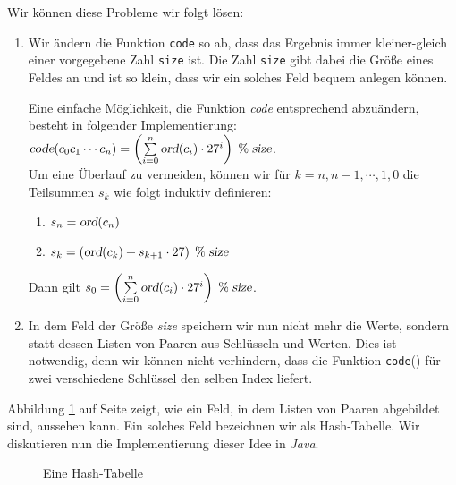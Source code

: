 Wir k\"onnen diese Probleme wir folgt l\"osen:
\begin{enumerate}
\item Wir \"andern die Funktion \texttt{code} so ab, dass das Ergebnis
      immer kleiner-gleich einer vorgegebene Zahl \texttt{size} ist.  Die Zahl
      \texttt{size} gibt dabei die Gr\"o{\ss}e eines Feldes an und ist so klein,
      dass wir ein solches Feld bequem anlegen k\"onnen.

      Eine einfache M\"oglichkeit, die Funktion \textsl{code} entsprechend abzu\"andern,
      besteht in folgender Implementierung: \\[0.2cm]
      \hspace*{1.3cm} 
      $\textsl{code}(c_0c_1\cdots c_n) = \left(\sum\limits_{i=0}^n \textsl{ord}(c_i) \cdot 27^i\right) \;\%\; \textsl{size}$.
      \\[0.2cm]
      Um eine Überlauf zu vermeiden, k\"onnen wir f\"ur $k=n,n-1,\cdots,1,0$ die Teilsummen $s_k$
      wie folgt induktiv definieren:
      \begin{enumerate}
      \item $s_n = \textsl{ord}(c_n)$
      \item $s_{k} = \left(\textsl{ord}(c_{k}) + s_{k+1} \cdot 27 \right) \;\%\; \textsl{size}$
      \end{enumerate}
      Dann gilt
      \hspace*{1.3cm} 
      $s_0 = \left(\sum\limits_{i=0}^n \textsl{ord}(c_i) \cdot 27^i\right) \;\%\; \textsl{size}$.
      
\item In dem Feld der Gr\"o{\ss}e \textsl{size} speichern wir nun nicht mehr die Werte, sondern statt dessen
      Listen von Paaren aus Schl\"usseln und Werten.  Dies ist notwendig, denn wir k\"onnen
      nicht verhindern, dass die Funktion \texttt{code}() f\"ur zwei verschiedene
      Schl\"ussel den selben Index liefert.
\end{enumerate}
Abbildung \ref{fig:hash-example} auf Seite \pageref{fig:hash-example} zeigt, wie ein Feld,
in dem Listen von Paaren abgebildet sind, aussehen kann.  Ein solches Feld bezeichnen wir
als Hash-Tabelle.  Wir diskutieren nun die Implementierung dieser Idee in \textsl{Java}.


\begin{figure}[!ht]
  \centering
  \caption{Eine Hash-Tabelle}
  \label{fig:hash-example}
\end{figure}


